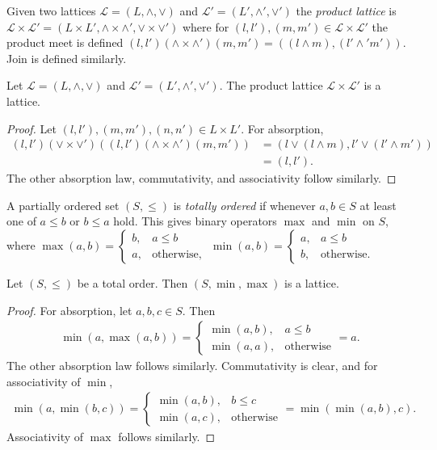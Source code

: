 \begin{definition}
  Given two lattices $\mathcal{L} = (L, \wedge, \vee)$ and $\mathcal{L'} = (L', \wedge', \vee')$ the \emph{product lattice} 
  is $\mathcal{L} \times \mathcal{L'} = (L \times L', \wedge \times \wedge', \vee \times \vee')$ where for $(l, l'), (m, m') \in \mathcal{L} \times \mathcal{L'}$
  the product meet is defined $(l, l') (\wedge \times \wedge') (m, m') = ((l \wedge m), (l' \wedge' m'))$. Join is defined similarly.
\end{definition}
\begin{prop}\label{productLatticeIsLattice}
  Let $\mathcal{L} = (L, \wedge, \vee)$ and $\mathcal{L'} = (L', \wedge', \vee')$. The product lattice $\mathcal{L} \times \mathcal{L'}$ is a lattice.
\end{prop}
\begin{proof}
  Let $(l, l'), (m, m'), (n, n') \in L \times L'$. For absorption, 
  \begin{align*}
    (l, l') (\vee \times \vee') ((l, l') (\wedge \times \wedge') (m, m')) &= (l \vee (l \wedge m), l' \vee (l' \wedge m')) \\
                                                                          &= (l, l').
  \end{align*}
  The other absorption law, commutativity, and associativity follow similarly.
\end{proof}
\begin{definition}
  A partially ordered set $(S, \leq)$ is \emph{totally ordered} if whenever $a, b \in S$ at least one of $a \leq b$ or $b \leq a$ hold.
  This gives binary operators $\max$ and $\min$ on $S$, where $\max (a, b) = \begin{cases} b, & a \leq b \\ a, & \text{otherwise,}  \end{cases}$
    $\min (a, b) = \begin{cases} a, & a \leq b \\ b, & \text{otherwise.}  \end{cases}$
\end{definition}
\begin{prop}
  Let $(S, \leq)$ be a total order. Then $(S, \min, \max)$ is a lattice.
\end{prop}
\begin{proof}
  For absorption, let $a, b, c \in S$. Then 
  \begin{align*}
    \min(a, \max(a, b)) = \begin{cases} \min(a, b), & a \leq b \\ \min(a, a), & \text{otherwise}\end{cases} = a.
  \end{align*}
  The other absorption law follows similarly. Commutativity is clear, and for associativity of $\min$,
  \begin{align*}
    \min(a, \min(b, c)) = \begin{cases} \min(a, b), &  b \leq c \\ \min(a, c), & \text{otherwise}\end{cases} = \min(\min(a, b), c).
  \end{align*}
  Associativity of $\max$ follows similarly.
\end{proof}
